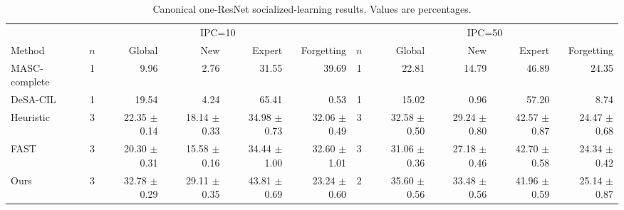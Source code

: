 \begin{table}[t]
\centering
\caption{Canonical one-ResNet socialized-learning results. Values are percentages.}
\begin{tabular}{lcrrrrcrrrr}
\toprule
& \multicolumn{5}{c}{IPC=10} & \multicolumn{5}{c}{IPC=50} \\
Method & $n$ & Global & New & Expert & Forgetting & $n$ & Global & New & Expert & Forgetting \\
\midrule
MASC-complete & 1 & 9.96 & 2.76 & 31.55 & 39.69 & 1 & 22.81 & 14.79 & 46.89 & 24.35 \\
DeSA-CIL & 1 & 19.54 & 4.24 & 65.41 & 0.53 & 1 & 15.02 & 0.96 & 57.20 & 8.74 \\
Heuristic & 3 & 22.35 $\pm$ 0.14 & 18.14 $\pm$ 0.33 & 34.98 $\pm$ 0.73 & 32.06 $\pm$ 0.49 & 3 & 32.58 $\pm$ 0.50 & 29.24 $\pm$ 0.80 & 42.57 $\pm$ 0.87 & 24.47 $\pm$ 0.68 \\
FAST & 3 & 20.30 $\pm$ 0.31 & 15.58 $\pm$ 0.16 & 34.44 $\pm$ 1.00 & 32.60 $\pm$ 1.01 & 3 & 31.06 $\pm$ 0.36 & 27.18 $\pm$ 0.46 & 42.70 $\pm$ 0.58 & 24.34 $\pm$ 0.42 \\
Ours & 3 & 32.78 $\pm$ 0.29 & 29.11 $\pm$ 0.35 & 43.81 $\pm$ 0.69 & 23.24 $\pm$ 0.60 & 2 & 35.60 $\pm$ 0.56 & 33.48 $\pm$ 0.56 & 41.96 $\pm$ 0.59 & 25.14 $\pm$ 0.87 \\
\bottomrule
\end{tabular}
\end{table}

